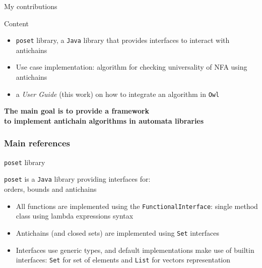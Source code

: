 \documentclass[10pt]{beamer}
\begin{document}
\begin{frame}{My contributions}
  \begin{block}{Content}
    \begin{itemize}
      \item \texttt{poset} library, a \texttt{Java} library that provides interfaces to interact with antichains \cite{poset-src}
      \item Use case implementation: algorithm for checking universality of NFA using antichains \cite{antichain-universality}
      \item a \textit{User Guide} (this work) on how to integrate an algorithm in \texttt{Owl} \cite{owl}
    \end{itemize}
    \begin{center}
      \textbf{The main goal is to provide a framework \\ to implement antichain algorithms in automata libraries}
    \end{center}
  \end{block}
\end{frame}

\begin{frame}[allowframebreaks]
    \frametitle{Main references}


\end{frame}

\begin{frame}[fragile]{\texttt{poset} library}

\begin{center}
\texttt{poset} is a \texttt{Java} library providing interfaces for: \\ orders, bounds and antichains
\end{center}

\begin{itemize}
  \item All functions are implemented using the \texttt{FunctionalInterface}: single method class using lambda expressions syntax
  \item Antichains (and closed sets) are implemented using \texttt{Set} interfaces
  \item Interfaces use generic types, and default implementations make use of builtin interfaces: \texttt{Set} for set of elements and \texttt{List} for vectors representation
\end{itemize}

\end{frame}
\end{document}
